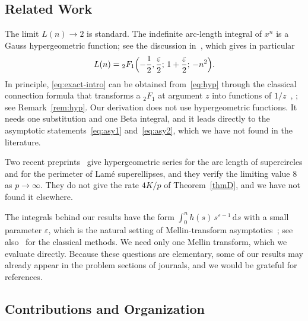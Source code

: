 \documentclass[journal]{IEEEtran}
\newcommand{\eps}{\varepsilon}
\newcommand{\dd}{\,\mathrm{d}}
\begin{document}
\subsection{Related Work}\label{sec:related}

The limit $L(n)\to2$ is standard. The indefinite arc-length integral of $x^n$ is a Gauss
hypergeometric function; see the discussion in~\cite{MSE}, which gives in particular
\begin{equation}\label{eq:hyp}
  L(n)={}_2F_1\Bigl(-\frac12,\frac{\eps}{2};\,1+\frac{\eps}{2};\,-n^2\Bigr).
\end{equation}
In principle, \eqref{eq:exact-intro} can be obtained from~\eqref{eq:hyp} through the classical
connection formula that transforms a ${}_2F_1$ at argument $z$ into functions of
$1/z$~\cite[Eq.~15.8.2]{DLMF}, \cite[Ch.~2]{AAR}; see Remark~\ref{rem:hyp}. Our derivation
does not use hypergeometric functions. It needs one substitution and one Beta integral, and
it leads directly to the asymptotic statements~\eqref{eq:asy1} and~\eqref{eq:asy2}, which we
have not found in the literature.

Two recent preprints~\cite{MRL,RM} give hypergeometric series for the arc length of
supercircles and for the perimeter of Lam\'e superellipses, and they verify the limiting
value $8$ as $p\to\infty$. They do not give the rate $4K/p$ of Theorem~\ref{thmD}, and we have
not found it elsewhere.

The integrals behind our results have the form $\int_0^n h(s)\,s^{\eps-1}\dd s$ with a small
parameter $\eps$, which is the natural setting of Mellin-transform
asymptotics~\cite{FGD,Wong}; see also~\cite{deBruijn} for the classical methods. We need only
one Mellin transform, which we evaluate directly. Because these questions are elementary, some
of our results may already appear in the problem sections of journals, and we would be grateful
for references.

\subsection{Contributions and Organization}\label{sec:contrib}
\end{document}
